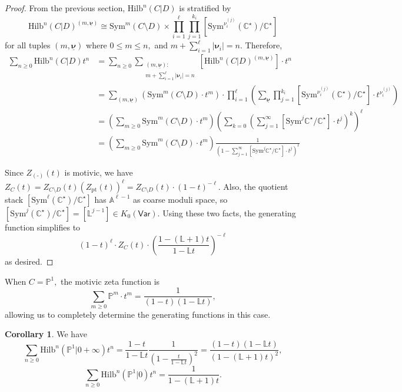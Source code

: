\documentclass[10.5pt]{amsart}
\theoremstyle{definition}
\theoremstyle{definition}
\theoremstyle{definition}
\theoremstyle{definition}
\newtheorem{corollary}[theorem]{Corollary}
\newcommand{\Hilb}{\mathrm{Hilb}}
\newcommand{\Sym}{\mathrm{Sym}}
\begin{document}
\begin{proof}
    From the previous section, $\Hilb^n(C|D)$ is stratified by \[\Hilb^{n}(C|D)^{(m,\underline{\boldsymbol{\nu}})}\cong \Sym^{m}(C\setminus D)\times \prod_{i=1}^{\ell}\prod_{j = 1}^{k_i}[\mathrm{Sym}^{\nu_i^{(j)}}(\mathbb{C}^\star)/\mathbb{C}^\star]\] for all tuples $(m,\underline{\boldsymbol{\nu}})$ where $0\leq m \leq n,$ and $m+\sum_{i=1}^\ell |\boldsymbol{\nu}_i|=n.$ Therefore, \begin{align*}\sum_{n\geq 0}\Hilb^n(C|D) t^n & = \sum_{n\geq 0}\sum_{\substack{(m, \underline{\boldsymbol{\nu}}):\\ m+\sum_{i=1}^\ell |\boldsymbol{\nu}_i|=n}}[\Hilb^{n}(C|D)^{(m,\underline{\boldsymbol{\nu}})}]\cdot t^{n}\\
    & = \sum_{(m, \underline{\boldsymbol{\nu}})}(\Sym^{m}(C\setminus D)\cdot t^m)\cdot \prod_{i=1}^{\ell}\left(\sum_{\underline{\boldsymbol{\nu}}}\prod_{j = 1}^{k_i}[\mathrm{Sym}^{\nu_i^{(j)}}(\mathbb{C}^\star)/\mathbb{C}^\star]\cdot t^{\nu_i^{(j)}}\right)\\ & = \left(\sum_{m\geq 0}\Sym^{m}(C\setminus D)\cdot t^m\right)\left(\sum_{k = 0}\left(\sum_{j=1}^\infty [\Sym^j \mathbb{C}^\star/\mathbb{C}^\star]\cdot t^j\right)^k\right)^\ell\\ & = \left(\sum_{m\geq 0}\Sym^{m}(C\setminus D)\cdot t^m\right)\frac{1}{\left(1-\sum_{j = 1}^{\infty} [\Sym^j \mathbb{C}^\star/\mathbb{C}^\star]\cdot t^j \right)^\ell}\end{align*}

    Since $Z_{(\text{-})}(t)$ is motivic, we have $Z_{C}(t) = Z_{C\setminus D}(t)\left(Z_{\mathrm{pt}}(t)\right)^\ell = Z_{C\setminus D}(t)\cdot (1-t)^{-\ell}.$ Also, the quotient stack $[\mathrm{Sym}^{\ell}(\mathbb{C}^\star)/\mathbb{C}^\star]$ has $\mathbb{A}^{\ell-1}$ as coarse moduli space, so $[\mathrm{Sym}^{j}(\mathbb{C}^\star)/\mathbb{C}^\star] = [\mathbb{L}^{j-1}]\in K_0(\mathsf{Var}).$ Using these two facts, the generating function simplifies to $${(1-t)^{\ell}\cdot Z_C(t)}\cdot {\left(\frac{1-(\mathbb{L}+1)t}{1-\mathbb{L}t}\right)^{-\ell}}$$ as desired.
\end{proof}

When $C = \mathbb{P}^1,$ the motivic zeta function is $$\sum_{m\geq 0}\mathbb{P}^m\cdot t^m = \frac{1}{(1-t)(1-\mathbb{L}t)},$$ allowing us to completely determine the generating functions in this case. 
\begin{corollary}
  We have $$\sum_{n\geq 0}\Hilb^n(\mathbb{P}^1|0+\infty)t^n = \frac{1-t}{1-\mathbb{L}t}\frac{1}{\left(1-\frac{t}{1-\mathbb{L}t}\right)^2} = \frac{(1-t)(1-\mathbb{L}t)}{(1- (\mathbb{L}+1) t)^2},$$ $$\sum_{n\geq 0}\Hilb^n(\mathbb{P}^1|0)t^n  = \frac{1}{1-(\mathbb{L}+1)t}.$$
\end{corollary}
\end{document}
